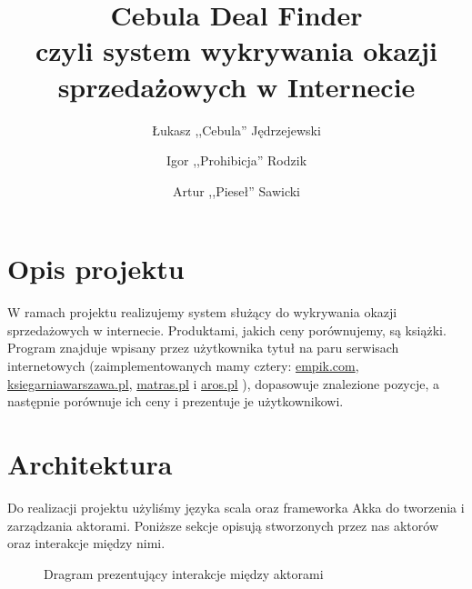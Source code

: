 \documentclass[a4paper,12pt]{mwart}
\begin{document}
\title{Cebula Deal Finder\\%
{\large czyli system wykrywania okazji sprzedażowych w Internecie} }

\author{Łukasz ,,Cebula'' Jędrzejewski \and Igor ,,Prohibicja'' Rodzik \and Artur ,,Pieseł'' Sawicki}

\maketitle

\section{Opis projektu}
W ramach projektu realizujemy system służący do wykrywania okazji sprzedażowych w internecie. Produktami, jakich ceny porównujemy, są książki.
Program znajduje wpisany przez użytkownika tytuł na paru serwisach internetowych (zaimplementowanych mamy cztery:
\href{http://www.empik.com}{empik.com}, \href{http://www.ksiegarniawarszawa.pl}{ksiegarniawarszawa.pl}, \href{http://www.matras.pl}{matras.pl} i \href{http://www.aros.pl}{aros.pl}
), dopasowuje znalezione pozycje, a następnie porównuje ich ceny i prezentuje je użytkownikowi.

\section{Architektura}
Do realizacji projektu użyliśmy języka scala oraz frameworka Akka do tworzenia i zarządzania aktorami.
Poniższe sekcje opisują stworzonych przez nas aktorów oraz interakcje między nimi.

\begin{figure}[H]
  \centering
  \caption{Dragram prezentujący interakcje między aktorami}
\end{figure}
\end{document}
